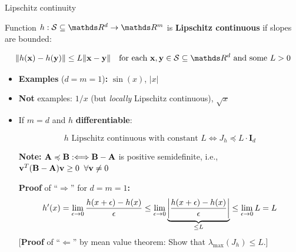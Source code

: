 \documentclass[11pt,compress,t,notes=noshow, xcolor=table]{beamer}
\begin{document}
\begin{vbframe}{Lipschitz continuity}



Function $h : \mathcal{S}\subseteq \R^d \to \R^m$ is \textbf{Lipschitz continuous} if slopes are bounded:

\vspace{-1.25\baselineskip}

\begin{equation*}
    \|h(\xv) - h(\yv)\| \leq L \|\xv - \yv\| \quad \text{for each $\xv,\yv\in\mathcal{S}\subseteq \R^d$ and some~$L>0$}
\end{equation*}


\begin{itemize}
    \item \textbf{Examples} ($d=m=1$)\textbf{:} $\sin(x)$, $|x|$
    \item \textbf{Not} examples: $1/x$ (but \textit{locally} Lipschitz continuous), $\sqrt{x}$
    \item If $m=d$ and $h$ \textbf{differentiable}:

        \vspace{-0.5\baselineskip}


            \vspace{-0.3\baselineskip}
            \begin{equation*}
                \text{$h$ Lipschitz continuous with constant $L$} \Longleftrightarrow J_h \preccurlyeq L \cdot \mathbf{I}_d
            \end{equation*}


        \begin{footnotesize}
            \textbf{Note:} $\mathbf{A} \preccurlyeq \mathbf{B} :\Longleftrightarrow \mathbf{B} - \mathbf{A}$ is positive semidefinite, i.e., $\mathbf{v}^T(\mathbf{B} - \mathbf{A})\mathbf{v} \geq 0 \;\; \forall \mathbf{v} \neq 0$

            \medskip

            \textbf{Proof} of \enquote{$\Rightarrow$} for $d=m=1$\textbf{:}
            \begin{equation*}
                h'(x) = \lim_{\epsilon\to0} \frac{h(x+\epsilon)-h(x)}{\epsilon} \leq \lim_{\epsilon\to0}\underbrace{\left|\frac{h(x+\epsilon)-h(x)}{\epsilon}\right|}_{\leq L} \leq \lim_{\epsilon\to0}L = L
            \end{equation*}
            [\textbf{Proof} of \enquote{$\Leftarrow$} by mean value theorem: Show that $\lambda_\text{max}(J_h) \leq L$.]
        \end{footnotesize}
\end{itemize}

\end{vbframe}
\end{document}
